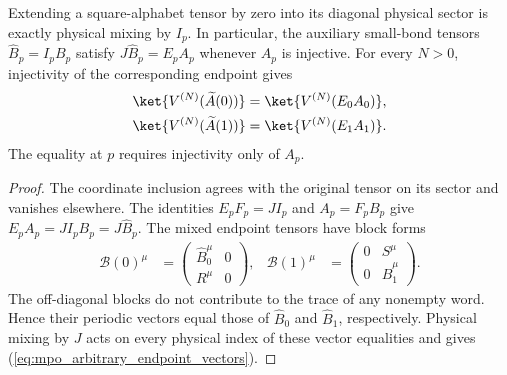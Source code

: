 \begin{lemma}
    \label{thm:mpo_arbitrary_endpoint_vectors}
    \leanok
    Extending a square-alphabet tensor by zero into its diagonal
    physical sector is exactly physical mixing by $I_p$.
    In particular, the auxiliary small-bond tensors
    $\widehat B_p=I_pB_p$ satisfy $J\widehat B_p=E_pA_p$ whenever
    $A_p$ is injective. For every $N>0$, injectivity of the corresponding
    endpoint gives
    \begin{align}
        \ket{V^{(N)}(\widetilde A(0))}
         & =\ket{V^{(N)}(E_0A_0)},\notag \\
        \ket{V^{(N)}(\widetilde A(1))}
         & =\ket{V^{(N)}(E_1A_1)}.
        \label{eq:mpo_arbitrary_endpoint_vectors}
    \end{align}
    The equality at $p$ requires injectivity only of $A_p$.
\end{lemma}
\begin{proof}\leanok
    The coordinate inclusion agrees with the original tensor on its
    sector and vanishes elsewhere. The identities
    $E_pF_p=JI_p$ and $A_p=F_pB_p$ give
    $E_pA_p=JI_pB_p=J\widehat B_p$.
    The mixed endpoint tensors have block forms
    \begin{align}
        \mathcal B(0)^\mu
         & =\begin{pmatrix}\widehat B_0^\mu&0\\ R^\mu&0\end{pmatrix},
         & \mathcal B(1)^\mu
         & =\begin{pmatrix}0&S^\mu\\0&\widehat B_1^\mu\end{pmatrix}.
        \label{eq:mpo_arbitrary_endpoint_blocks}
    \end{align}
    The off-diagonal blocks do not contribute to the trace of any
    nonempty word. Hence their periodic vectors equal those of
    $\widehat B_0$ and $\widehat B_1$, respectively. Physical mixing
    by $J$ acts on every physical index of these vector equalities and
    gives (\ref{eq:mpo_arbitrary_endpoint_vectors}).
\end{proof}


